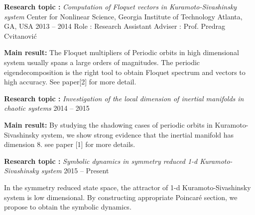 


\begin{cventries}

\cventrymore
{\textbf{Research topic :} \emph{Computation of Floquet vectors in Kuramoto-Sivashinsky system}}
{Center for Nonlinear Science, Georgia Institute of Technology}
{Atlanta, GA, USA}
{2013 -- 2014}
{Role : Research Assistant \quad Adviser : Prof. Predrag Cvitanovi\'c }
{
  \begin{cvitems}
  \item {\textbf{Main result:} The Floquet multipliers of Periodic orbits in high dimensional system 
      usually spans a large orders of magnitudes. The periodic eigendecomposition is the right tool
      to obtain Floquet spectrum and vectors to high accuracy. See paper[2] for more detail.
    }
  \end{cvitems}
}

\cventry
{\textbf{Research topic :} \emph{Investigation of the local dimension of inertial manifolds in chaotic systems}}
{}{}
{2014 -- 2015}
{
  \begin{cvitems}
    \item {\textbf{Main result:} By studying the shadowing cases of periodic orbits in
        Kuramoto-Sivashinsky system, we show strong evidence that the inertial manifold has
        dimension 8. see paper [1] for more details.}
  \end{cvitems}
}

\cventry
{\textbf{Research topic :} \emph{Symbolic dynamics in symmetry reduced 1-d Kuramoto-Sivashinsky system}}
{}{}
{2015 -- Present}
{
  \begin{cvitems}
      \item {In the symmetry reduced state space, the attractor of  1-d Kuramoto-Sivashinsky system
          is low dimensional. By constructing appropriate Poincar\'e section, we propose to obtain the
          symbolic dynamics. }
  \end{cvitems}
}



\end{cventries}
